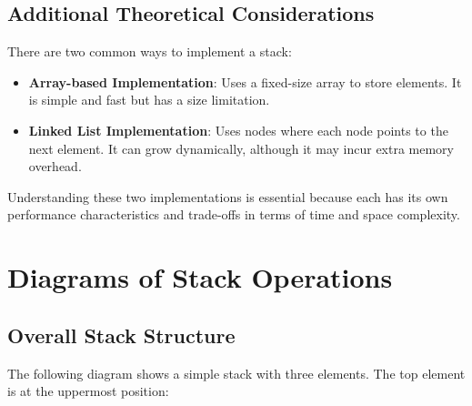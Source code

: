 \subsection{Additional Theoretical Considerations}
There are two common ways to implement a stack:
\begin{itemize}
    \item \textbf{Array-based Implementation}: Uses a fixed-size array to store elements. It is simple and fast but has a size limitation.
    \item \textbf{Linked List Implementation}: Uses nodes where each node points to the next element. It can grow dynamically, although it may incur extra memory overhead.
\end{itemize}

Understanding these two implementations is essential because each has its own performance characteristics and trade-offs in terms of time and space complexity.

\section{Diagrams of Stack Operations}

\subsection{Overall Stack Structure}
The following diagram shows a simple stack with three elements. The top element is at the uppermost position:
\begin{center}
\end{center}

